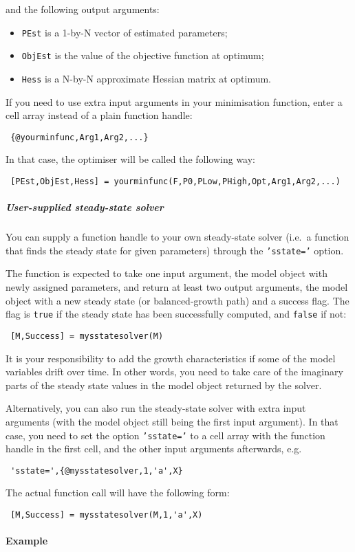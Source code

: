  and the following output arguments:
 
 \begin{itemize}
 \item
   \texttt{PEst} is a 1-by-N vector of estimated parameters;
 \item
   \texttt{ObjEst} is the value of the objective function at optimum;
 \item
   \texttt{Hess} is a N-by-N approximate Hessian matrix at optimum.
 \end{itemize}
 
 If you need to use extra input arguments in your minimisation function,
 enter a cell array instead of a plain function handle:
 
 \begin{verbatim}
 {@yourminfunc,Arg1,Arg2,...}
 \end{verbatim}
 
 In that case, the optimiser will be called the following way:
 
 \begin{verbatim}
 [PEst,ObjEst,Hess] = yourminfunc(F,P0,PLow,PHigh,Opt,Arg1,Arg2,...)
 \end{verbatim}
 
 \subparagraph{User-supplied steady-state solver}
 
 You can supply a function handle to your own steady-state solver (i.e.~a
 function that finds the steady state for given parameters) through the
 \texttt{'sstate='} option.
 
 The function is expected to take one input argument, the model object
 with newly assigned parameters, and return at least two output
 arguments, the model object with a new steady state (or balanced-growth
 path) and a success flag. The flag is \texttt{true} if the steady state
 has been successfully computed, and \texttt{false} if not:
 
 \begin{verbatim}
 [M,Success] = mysstatesolver(M)
 \end{verbatim}
 
 It is your responsibility to add the growth characteristics if some of
 the model variables drift over time. In other words, you need to take
 care of the imaginary parts of the steady state values in the model
 object returned by the solver.
 
 Alternatively, you can also run the steady-state solver with extra input
 arguments (with the model object still being the first input argument).
 In that case, you need to set the option \texttt{'sstate='} to a cell
 array with the function handle in the first cell, and the other input
 arguments afterwards, e.g.
 
 \begin{verbatim}
 'sstate=',{@mysstatesolver,1,'a',X}
 \end{verbatim}
 
 The actual function call will have the following form:
 
 \begin{verbatim}
 [M,Success] = mysstatesolver(M,1,'a',X)
 \end{verbatim}
 
 \paragraph{Example}


